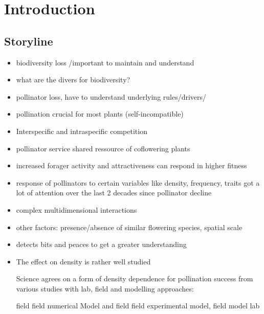 \section{Introduction}

\subsection*{Storyline}


%

\begin{itemize}

\item biodiversity loss /important to maintain and understand 
\item what are the divers for biodiversity?
\item pollinator loss, have to understand underlying rules/drivers/

\item pollination crucial for most plants (self-incompatible)
\item Interspecific and intraspecific competition
\item pollinator service shared ressource of coflowering plants
\item increased forager activity and attractiveness can respond in higher fitness

\item response of pollinators to certain variables like density, frequency, traits got a lot of attention over the last 2 decades since pollinator decline
\item complex multidimensional interactions
\item other factors: presence/absence of similar flowering species, spatial scale
\item detects bits and peaces to get a greater understanding
\item The effect on density is rather well studied

Science agrees on a form of density dependence for pollination success from various studies with lab, field and modelling approaches:

\citep{bernhardt2008effects} field
\citep{elliott2009effects} field
\citep{essenberg2012explaining} numerical Model and field
\citep{Kunin1997} field
\citep{kunin1993sex} experimental
\citep{morris2010benefit} model, field
\citep{rands2010effects} model
\citep{stout1998influence} lab


\end{itemize}
